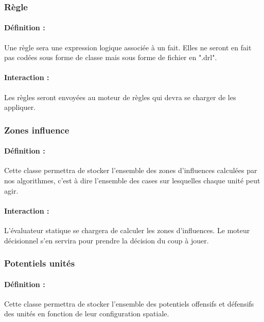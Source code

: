 \documentclass[12pt]{article}
\begin{document}
			\subsubsection{Règle}

				\paragraph{Définition :}

				Une règle sera une expression logique associée à un fait. Elles ne seront en fait pas codées sous forme de classe mais sous forme de fichier en ".drl".

				\paragraph{Interaction :}

				Les règles seront envoyées au moteur de règles qui devra se charger de les appliquer.

			\subsubsection{Zones influence}

				\paragraph{Définition :}

				Cette classe permettra de stocker l'ensemble des zones d'influences calculées par nos algorithmes, c'est à dire l'ensemble des cases sur lesquelles chaque unité peut agir.

				\paragraph{Interaction :}

				L'évaluateur statique se chargera de calculer les zones d'influences. Le moteur décisionnel s'en servira pour prendre la décision du coup à jouer.

			\subsubsection{Potentiels unités}

				\paragraph{Définition :}

				Cette classe permettra de stocker l'ensemble des potentiels offensifs et défensifs des unités en fonction de leur configuration spatiale.
\end{document}
